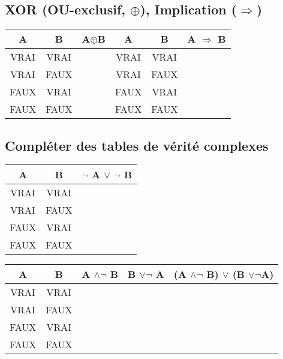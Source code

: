 \subsection{XOR (OU-exclusif, $\oplus$), Implication ($\Rightarrow$)}

\begin{tabular}{c|c|c||c|c|c}
A	&B	&A$\oplus$B&A	&B	&A $\Rightarrow$ B\\
\hline
\hline
VRAI	&VRAI	&	&VRAI	&VRAI	&\\
\hline
VRAI	&FAUX	&	&VRAI	&FAUX	&\\
\hline
FAUX	&VRAI	&	&FAUX	&VRAI	&\\
\hline
FAUX	&FAUX	&	&FAUX	&FAUX	&\\
\end{tabular}


  \subsection{Compléter des tables de vérité complexes}

\begin{table}[h]
\begin{tabular}{c|c|c}
A	&B	& $\neg$ A $\vee$ $\neg$ B\\ 
\hline
\hline
VRAI	&VRAI	&	\\
\hline
VRAI	&FAUX	&	\\
\hline
FAUX	&VRAI	&	\\
\hline
FAUX	&FAUX	&	\\
\end{tabular}
\end{table}

\begin{table}[h]
\begin{tabular}{c|c|c|c|c}
A	&B	& A $\wedge \neg$ B&B $\vee \neg$ A
		&(A $\wedge \neg$ B) $\vee$ (B $\vee \neg$A)\\
\hline
\hline
VRAI	&VRAI	&	&&\\
\hline
VRAI	&FAUX	&	&&\\
\hline
FAUX	&VRAI	&	&&\\
\hline
FAUX	&FAUX	&	&&\\
\end{tabular}
\end{table}

